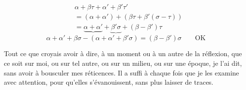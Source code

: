 \[
\begin{aligned}
&\alpha+\beta\tau+\alpha'+\beta'\tau'\\
&=(\alpha+\alpha')+(\beta\tau+\beta'(\sigma-\tau))\\
&=\underbrace{\alpha+\alpha'}+\underbrace{\beta'\sigma}+(\beta-\beta')\tau
\end{aligned}
\]
\[\alpha+\alpha'+\beta\sigma-(\alpha+\alpha'+\beta'\sigma)
 =(\beta-\beta')\sigma\qquad\text{OK}\]

Tout ce que  croyais avoir à dire, à un moment ou à un autre
de la réflexion, \inserted{(}que ce soit sur moi, ou sur tel autre, ou sur un milieu,
ou sur une époque, je l'ai dit, sans avoir à bousculer mes réticences.
Il a suffi à chaque fois que je les examine avec attention, pour qu'elles s'évanouissent,
sans plus laisser de traces.

